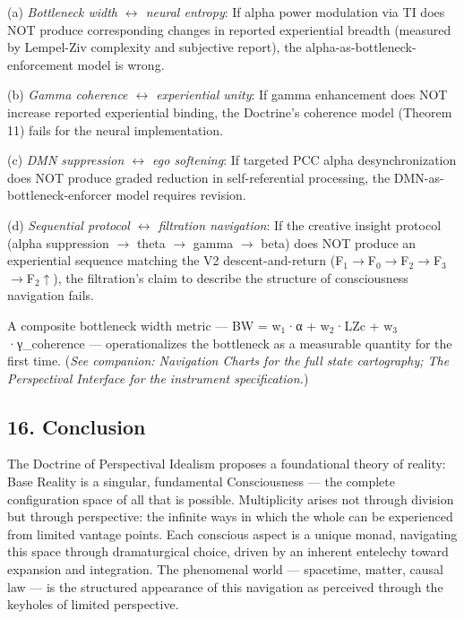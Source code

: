 (a) \textit{Bottleneck width $\leftrightarrow$ neural entropy}: If alpha power modulation via TI does NOT produce corresponding changes in reported experiential breadth (measured by Lempel-Ziv complexity and subjective report), the alpha-as-bottleneck-enforcement model is wrong.


(b) \textit{Gamma coherence $\leftrightarrow$ experiential unity}: If gamma enhancement does NOT increase reported experiential binding, the Doctrine's coherence model (Theorem 11) fails for the neural implementation.


(c) \textit{DMN suppression $\leftrightarrow$ ego softening}: If targeted PCC alpha desynchronization does NOT produce graded reduction in self-referential processing, the DMN-as-bottleneck-enforcer model requires revision.


(d) \textit{Sequential protocol $\leftrightarrow$ filtration navigation}: If the creative insight protocol (alpha suppression $\rightarrow$ theta $\rightarrow$ gamma $\rightarrow$ beta) does NOT produce an experiential sequence matching the V2 descent-and-return (F$_1$$\rightarrow$F$_0$$\rightarrow$F$_2$$\rightarrow$F$_3$$\rightarrow$F$_2$$\uparrow$), the filtration's claim to describe the structure of consciousness navigation fails.


A composite bottleneck width metric — BW = w$_1$·α + w$_2$·LZc + w$_3$·γ\_coherence — operationalizes the bottleneck as a measurable quantity for the first time. (\textit{See companion: Navigation Charts for the full state cartography; The Perspectival Interface for the instrument specification.})


\bigskip\noindent\makebox[\textwidth]{\color{rulegray}\rule{5cm}{0.3pt}}\bigskip


\subsection*{16. Conclusion}


The Doctrine of Perspectival Idealism proposes a foundational theory of reality: Base Reality is a singular, fundamental Consciousness — the complete configuration space of all that is possible. Multiplicity arises not through division but through perspective: the infinite ways in which the whole can be experienced from limited vantage points. Each conscious aspect is a unique monad, navigating this space through dramaturgical choice, driven by an inherent entelechy toward expansion and integration. The phenomenal world — spacetime, matter, causal law — is the structured appearance of this navigation as perceived through the keyholes of limited perspective.


